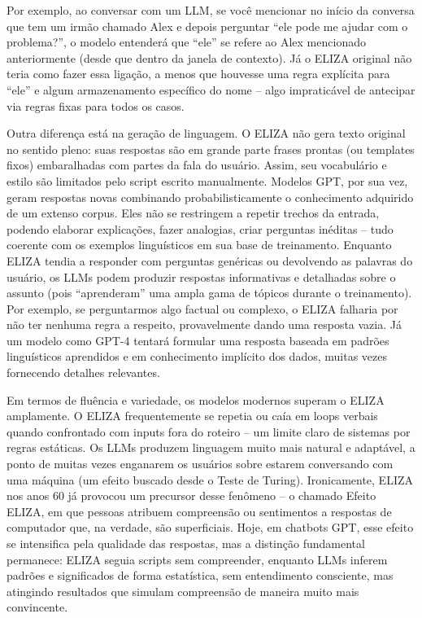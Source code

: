 \documentclass[14pt,a4paper,oneside]{book}
\begin{document}
Por exemplo, ao conversar com um LLM, se você mencionar no início da conversa que tem um irmão chamado Alex e depois perguntar “ele pode me ajudar com o problema?”, o modelo entenderá que “ele” se refere ao Alex mencionado anteriormente (desde que dentro da janela de contexto). Já o ELIZA original não teria como fazer essa ligação, a menos que houvesse uma regra explícita para “ele” e algum armazenamento específico do nome – algo impraticável de antecipar via regras fixas para todos os casos.

Outra diferença está na geração de linguagem. O ELIZA não gera texto original no sentido pleno: suas respostas são em grande parte frases prontas (ou templates fixos) embaralhadas com partes da fala do usuário. Assim, seu vocabulário e estilo são limitados pelo script escrito manualmente. Modelos GPT, por sua vez, geram respostas novas combinando probabilisticamente o conhecimento adquirido de um extenso corpus. Eles não se restringem a repetir trechos da entrada, podendo elaborar explicações, fazer analogias, criar perguntas inéditas – tudo coerente com os exemplos linguísticos em sua base de treinamento. Enquanto ELIZA tendia a responder com perguntas genéricas ou devolvendo as palavras do usuário, os LLMs podem produzir respostas informativas e detalhadas sobre o assunto (pois “aprenderam” uma ampla gama de tópicos durante o treinamento). Por exemplo, se perguntarmos algo factual ou complexo, o ELIZA falharia por não ter nenhuma regra a respeito, provavelmente dando uma resposta vazia. Já um modelo como GPT-4 tentará formular uma resposta baseada em padrões linguísticos aprendidos e em conhecimento implícito dos dados, muitas vezes fornecendo detalhes relevantes.

Em termos de fluência e variedade, os modelos modernos superam o ELIZA amplamente. O ELIZA frequentemente se repetia ou caía em loops verbais quando confrontado com inputs fora do roteiro – um limite claro de sistemas por regras estáticas. Os LLMs produzem linguagem muito mais natural e adaptável, a ponto de muitas vezes enganarem os usuários sobre estarem conversando com uma máquina (um efeito buscado desde o Teste de Turing). Ironicamente, ELIZA nos anos 60 já provocou um precursor desse fenômeno – o chamado Efeito ELIZA, em que pessoas atribuem compreensão ou sentimentos a respostas de computador que, na verdade, são superficiais. Hoje, em chatbots GPT, esse efeito se intensifica pela qualidade das respostas, mas a distinção fundamental permanece: ELIZA seguia scripts sem compreender, enquanto LLMs inferem padrões e significados de forma estatística, sem entendimento consciente, mas atingindo resultados que simulam compreensão de maneira muito mais convincente. 
\end{document}
